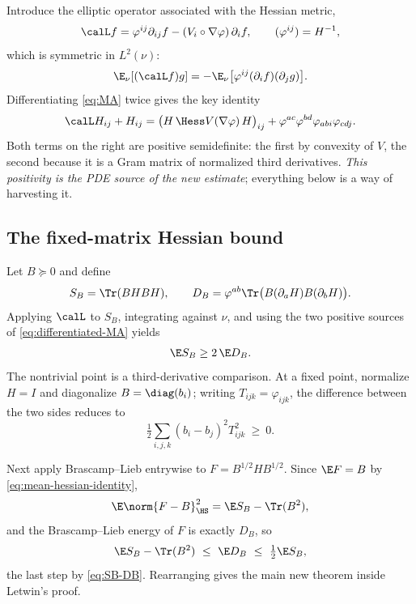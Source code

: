 \documentclass[../../main.tex]{subfiles}
\begin{document}
Introduce the elliptic operator associated with the Hessian metric,
\begin{equation}
  \calL f=\varphi^{ij}\partial_{ij}f-(V_i\circ\nabla\varphi)\,\partial_if,
  \qquad (\varphi^{ij})=H^{-1},
  \label{eq:calL-def}
\end{equation}
which is symmetric in $L^2(\nu)$:
\begin{equation}
  \E_\nu[(\calL f)g]=-\E_\nu\bigl[\varphi^{ij}(\partial_if)(\partial_jg)\bigr].
  \label{eq:calL-symmetric}
\end{equation}
Differentiating \eqref{eq:MA} twice gives the key identity
\begin{equation}
  \calL H_{ij}+H_{ij}
  =\bigl(H\,\Hess V(\nabla\varphi)\,H\bigr)_{ij}
  +\varphi^{ac}\varphi^{bd}\varphi_{abi}\varphi_{cdj} .
  \label{eq:differentiated-MA}
\end{equation}
Both terms on the right are positive semidefinite: the first by convexity of $V$, the second
because it is a Gram matrix of normalized third derivatives. \emph{This positivity is the PDE
source of the new estimate}; everything below is a way of harvesting it.

\subsection{The fixed-matrix Hessian bound}
\label{subsec:mm-fixed-matrix}

Let $B\succeq0$ and define
\[
  S_B=\Tr(BHBH),
  \qquad
  D_B=\varphi^{ab}\Tr\bigl(B(\partial_aH)B(\partial_bH)\bigr).
\]
Applying $\calL$ to $S_B$, integrating against $\nu$, and using the two positive sources of
\eqref{eq:differentiated-MA} yields
\begin{equation}
  \E S_B\ge2\,\E D_B .
  \label{eq:SB-DB}
\end{equation}
The nontrivial point is a third-derivative comparison. At a fixed point, normalize $H=I$ and
diagonalize $B=\diag(b_i)$; writing $T_{ijk}=\varphi_{ijk}$, the difference between the two sides
reduces to
\begin{equation}
  \tfrac12\sum_{i,j,k}(b_i-b_j)^2T_{ijk}^2\ \ge\ 0 .
  \label{eq:third-derivative-comparison}
\end{equation}

Next apply Brascamp--Lieb entrywise to $F=B^{1/2}HB^{1/2}$. Since $\E F=B$ by
\eqref{eq:mean-hessian-identity},
\[
  \E\norm{F-B}_{\HS}^2=\E S_B-\Tr(B^2),
\]
and the Brascamp--Lieb energy of $F$ is exactly $D_B$, so
\[
  \E S_B-\Tr(B^2)\ \le\ \E D_B\ \le\ \tfrac12\E S_B ,
\]
the last step by \eqref{eq:SB-DB}. Rearranging gives the main new theorem inside Letwin's proof.
\end{document}
